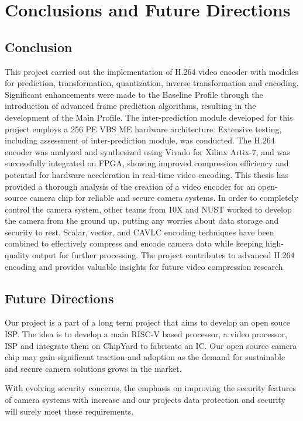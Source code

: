 
\chapter{Conclusions and Future Directions} %
\label{Chapter6}
\section{Conclusion}
This project carried out the implementation of H.264 video encoder with modules for prediction, transformation, quantization, inverse transformation and encoding.  Significant enhancements were made to the Baseline Profile through the introduction of advanced frame prediction algorithms, resulting in the development of the Main Profile. The inter-prediction module developed for this project employs a 256 PE VBS ME hardware architecture. Extensive testing, including assessment of inter-prediction module, was conducted. The H.264 encoder was analyzed and synthesized using Vivado for Xilinx Artix-7, and was successfully integrated on FPGA, showing improved compression efficiency and potential for hardware acceleration in real-time video encoding. This thesis has provided a thorough analysis of the creation of a video encoder for an open-source camera chip for reliable and secure camera systems. In order to completely control the camera system, other teams from 10X and NUST worked to develop the camera from the ground up, putting any worries about data storage and security to rest. Scalar, vector, and CAVLC encoding techniques have been combined to effectively compress and encode camera data while keeping high-quality output for further processing. The project contributes to advanced H.264 encoding and provides valuable insights for future video compression research.
\section{Future Directions}
Our project is a part of a long term project that aims to develop an open souce ISP. The idea is to develop a main RISC-V based processor, a video processor, ISP and integrate them on ChipYard to fabricate an IC. Our open source camera chip may gain significant traction and adoption as the demand for sustainable and secure camera solutions grows in the market.

With evolving security concerns, the emphasis on improving the security features of camera systems with increase and our projects data protection and security will surely meet these requirements.

